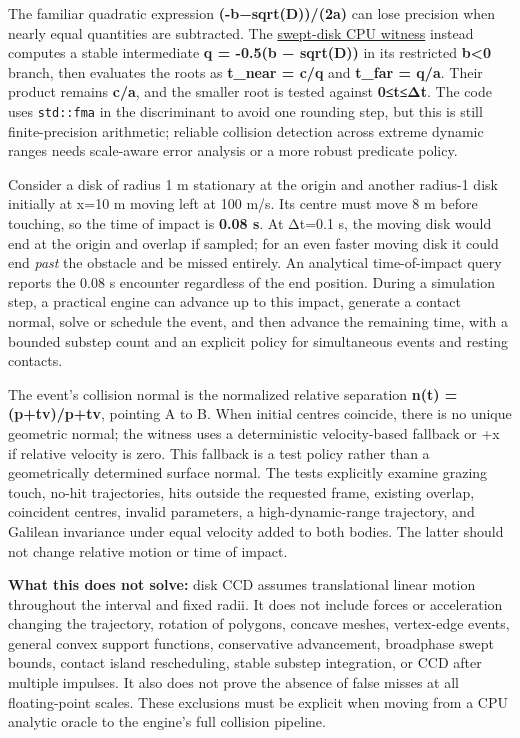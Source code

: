 The familiar quadratic expression \textbf{(-b−sqrt(D))/(2a)} can lose precision when nearly equal quantities are subtracted. The \hyperref[source-file-887bbb1db2a031cbbf1eee43]{swept-disk CPU witness} instead computes a stable intermediate \textbf{q = -0.5(b − sqrt(D))} in its restricted \textbf{b\textless0} branch, then evaluates the roots as \textbf{t\_near = c/q} and \textbf{t\_far = q/a}. Their product remains \textbf{c/a}, and the smaller root is tested against \textbf{0≤t≤Δt}. The code uses \texttt{std::fma} in the discriminant to avoid one rounding step, but this is still finite-precision arithmetic; reliable collision detection across extreme dynamic ranges needs scale-aware error analysis or a more robust predicate policy.

Consider a disk of radius 1 m stationary at the origin and another radius-1 disk initially at x=10 m moving left at 100 m/s. Its centre must move 8 m before touching, so the time of impact is \textbf{0.08 s}. At Δt=0.1 s, the moving disk would end at the origin and overlap if sampled; for an even faster moving disk it could end \emph{past} the obstacle and be missed entirely. An analytical time-of-impact query reports the 0.08 s encounter regardless of the end position. During a simulation step, a practical engine can advance up to this impact, generate a contact normal, solve or schedule the event, and then advance the remaining time, with a bounded substep count and an explicit policy for simultaneous events and resting contacts.

The event's collision normal is the normalized relative separation \textbf{n(t) = (p+tv)/\textbar p+tv\textbar{}}, pointing A to B. When initial centres coincide, there is no unique geometric normal; the witness uses a deterministic velocity-based fallback or +x if relative velocity is zero. This fallback is a test policy rather than a geometrically determined surface normal. The tests explicitly examine grazing touch, no-hit trajectories, hits outside the requested frame, existing overlap, coincident centres, invalid parameters, a high-dynamic-range trajectory, and Galilean invariance under equal velocity added to both bodies. The latter should not change relative motion or time of impact.

\textbf{What this does not solve:} disk CCD assumes translational linear motion throughout the interval and fixed radii. It does not include forces or acceleration changing the trajectory, rotation of polygons, concave meshes, vertex-edge events, general convex support functions, conservative advancement, broadphase swept bounds, contact island rescheduling, stable substep integration, or CCD after multiple impulses. It also does not prove the absence of false misses at all floating-point scales. These exclusions must be explicit when moving from a CPU analytic oracle to the engine's full collision pipeline.

